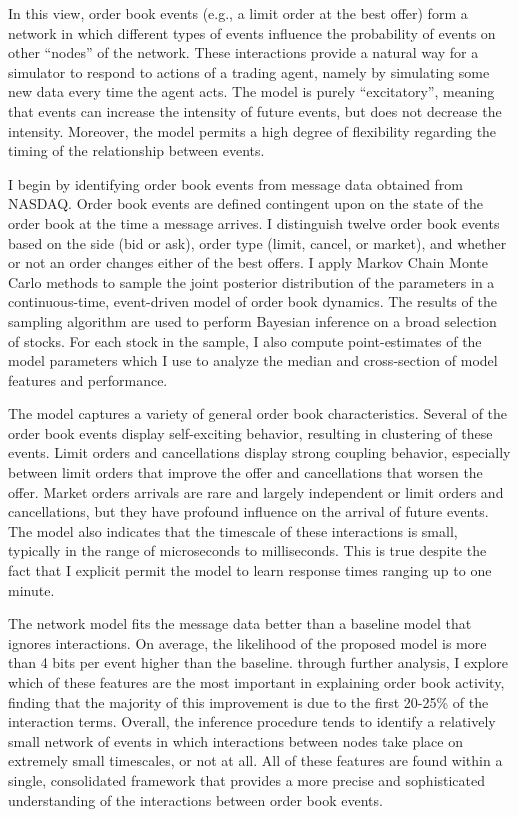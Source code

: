 	In this view, order book events (e.g., a limit order at the best offer) form a network in which different types of events influence the probability of events on other ``nodes'' of the network. These interactions provide a natural way for a simulator to respond to actions of a trading agent, namely by simulating some new data every time the agent acts. The model is purely ``excitatory'', meaning that events can increase the intensity of future events, but does not decrease the intensity. Moreover, the model permits a high degree of flexibility regarding the timing of the relationship between events.

	I begin by identifying order book events from message data obtained from NASDAQ. Order book events are defined contingent upon on the state of the order book at the time a message arrives. I distinguish twelve order book events based on the side (bid or ask), order type (limit, cancel, or market), and whether or not an order changes either of the best offers. I apply Markov Chain Monte Carlo methods to sample the joint posterior distribution of the parameters in a continuous-time, event-driven model of order book dynamics. The results of the sampling algorithm are used to perform Bayesian inference on a broad selection of stocks. For each stock in the sample, I also compute point-estimates of the model parameters which I use to analyze the median and cross-section of model features and performance.

	The model captures a variety of general order book characteristics. Several of the order book events display self-exciting behavior, resulting in clustering of these events. Limit orders and cancellations display strong coupling behavior, especially between limit orders that improve the offer and cancellations that worsen the offer. Market orders arrivals are rare and largely independent or limit orders and cancellations, but they have profound influence on the arrival of future events. The model also indicates that the timescale of these interactions is small, typically in the range of microseconds to milliseconds. This is true despite the fact that I explicit permit the model to learn response times ranging up to one minute.

	The network model fits the message data better than a baseline model that ignores interactions. On average, the likelihood of the proposed model is more than 4 bits per event higher than the baseline. through further analysis, I explore which of these features are the most important in explaining order book activity, finding that the majority of this improvement is due to the first 20-25\% of the interaction terms. Overall, the inference procedure tends to identify a relatively small network of events in which interactions between nodes take place on extremely small timescales, or not at all. All of these features are found within a single, consolidated framework that provides a more precise and sophisticated understanding of the interactions between order book events.

